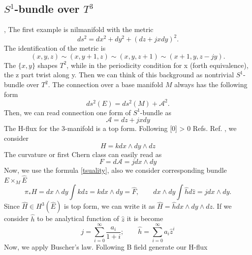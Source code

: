 \documentclass[a4paper]{article}
\renewcommand{\cite}[1]{%
\begingroup
\def\tempx{0}%
  \StrCount{#1}{,}[\tempx]%
  \ifnum\tempx > 0 
  Refs. %
  \else
  Ref. %
  \fi
\endgroup
\origcite{#1}%
}
\begin{document}
\subsection{$S^1$-bundle over $T^3$ }
,
The first example is nilmanifold with the metric
\begin{equation}
ds^2= dx^2+dy^2+\left( dz + j x dy\right)^2.
\end{equation}
The identification of the metric is
\begin{equation}
(x,y,z) \sim (x, y+1,z) \sim (x, y, z+1) \sim (x+1, y, z - jy).
\end{equation}
The $\{ x, y\}$ shapes $T^2$, while in the periodicity condition for x (forth equivalence), the z part twist along y. Then we can think of this background as nontrivial $S^1$-bundle over $T^2$. The connection over a base manifold $M$ always has the following form
\begin{equation}
ds^2(E) = ds^2(M) + \mathcal{A}^2.
\end{equation}
Then, we can read connection one form of $S^1$-bundle as 
\begin{equation}
\mathcal{A} = dz + j x dy
\end{equation}
The H-flux for the 3-manifold is a top form. Following \cite{mathai}, we consider 
\begin{equation}
H= k dx\wedge dy \wedge dz
\end{equation}
The curvature or first Chern class can easily read as
\begin{equation}
F=d \mathcal{A} =j dx \wedge dy
\end{equation}
Now,  we use the formula \eqref{tsuality}, also we consider corresponding bundle $E \times_M \hat{E}$
\begin{equation}\label{hex1}
\pi_* H = dx \wedge dy \int k dz = k dx \wedge dy = \hat{F}, \qquad dx \wedge dy\int \hat{h} d \hat{z} = j dx \wedge dy.
\end{equation}
Since $\hat{H} \in H^3(\hat{E})$ is top form, we can write it as $\hat{H} = \hat{h} dx \wedge dy \wedge dz$. If we consider $\hat{h}$ to be analytical function of $\hat{z}$ it is become
\begin{equation}
j = \sum_{i=0}^{\infty} \frac{a_i}{1+i} ;\qquad \hat{h}=\sum_{i=0}^{\infty} a_i \hat{z}^i 
\end{equation}
Now, we apply Buscher's law. Following B field generate our H-flux
\end{document}

